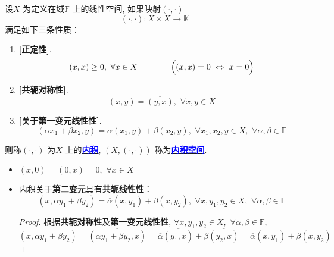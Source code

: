 	\begin{defn}\label{def 3.1.1}
		设$X$ 为定义在域$\mathbb{F}$ 上的线性空间, 如果映射$(\cdot , \cdot)$
		\[ (\cdot , \cdot) : X \times X \longrightarrow \mathbb{K} \]
		满足如下三条性质：
		\begin{enumerate}
			\item \textbf{[正定性]}. 
			\[ (x , x) \geq 0 , \,\, \forall x \in X \hspace*{4em} \Big( (x , x) = 0 \,\, \Leftrightarrow \,\, x = 0 \Big) \]
			
			\item \textbf{[共轭对称性]}. 
			\[ (x , y) = \overline{(y , x)} , \,\, \forall x , y \in X \]
			
			\item \textbf{[关于第一变元线性性]}. 
			\[ (\alpha x_1 + \beta x_2 , y) = \alpha (x_1 , y) + \beta (x_2 , y) , \,\, \forall x_1 , x_2 , y \in X , \,\, \forall \alpha , \beta \in \mathbb{F} \]
		\end{enumerate}
		则称$(\cdot , \cdot)$ 为$X$ 上的\underline{\textcolor{blue}{\textbf{内积}}}, $(X , (\cdot , \cdot))$ 称为\underline{\textcolor{blue}{\textbf{内积空间}}}. 
		
		\vspace{4em}
		
		\begin{rmk}
			\begin{itemize}
				\item $(x , 0) = (0 , x) = 0 , \,\, \forall x \in X$
				
				\vspace{3em}
				
				\item 内积关于\textbf{第二变元}具有\textbf{共轭线性性}：
				\[ (x , \alpha y_1 + \beta y_2) = \overline{\alpha} (x , y_1) + \overline{\beta} (x , y_2) , \,\, \forall x , y_1 , y_2 \in X , \,\, \forall \alpha , \beta \in \mathbb{F} \]
				
				\newpage
				
				\begin{proof}
					根据\textbf{共轭对称性}及\textbf{第一变元线性性}, $\forall x , y_1 , y_2 \in X , \,\, \forall \alpha , \beta \in \mathbb{F}$, 
					\[
						(x , \alpha y_1 + \beta y_2) 
						= \overline{(\alpha y_1 + \beta y_2 , x)} 
						= \overline{\alpha} \overline{(y_1  ,x)} + \overline{\beta} \overline{(y_2 , x)} 
						= \overline{\alpha} (x , y_1) + \overline{\beta} (x , y_2)
					\]
				\end{proof}
				

\end{itemize}
\end{rmk}
\end{defn}
